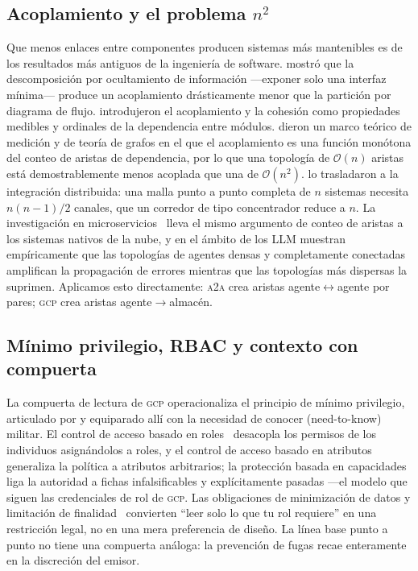 \documentclass[10pt,twocolumn,letterpaper]{article}
\newcommand{\gcp}{\textsc{gcp}}
\newcommand{\ata}{\textsc{a2a}}
\newcommand{\bigoh}{\mathcal{O}}
\begin{document}
\subsection{Acoplamiento y el problema $n^2$}
Que menos enlaces entre componentes producen sistemas más mantenibles es de los
resultados más antiguos de la ingeniería de software. \citet{parnas1972} mostró
que la descomposición por ocultamiento de información ---exponer solo una interfaz
mínima--- produce un acoplamiento drásticamente menor que la partición por
diagrama de flujo. \citet{stevens1974} introdujeron el acoplamiento y la cohesión
como propiedades medibles y ordinales de la dependencia entre módulos.
\citet{briand1999} dieron un marco teórico de medición y de teoría de grafos en
el que el acoplamiento es una función monótona del conteo de aristas de
dependencia, por lo que una topología de $\bigoh(n)$ aristas está demostrablemente
menos acoplada que una de $\bigoh(n^2)$. \citet{hohpe2003} lo trasladaron a la
integración distribuida: una malla punto a punto completa de $n$ sistemas necesita
$n(n{-}1)/2$ canales, que un corredor de tipo concentrador reduce a $n$. La
investigación en microservicios~\citep{panichella2021} lleva el mismo argumento de
conteo de aristas a los sistemas nativos de la nube, y en el ámbito de los LLM
\citet{shen2025topology} muestran empíricamente que las topologías de agentes
densas y completamente conectadas amplifican la propagación de errores mientras
que las topologías más dispersas la suprimen. Aplicamos esto directamente: \ata{}
crea aristas agente$\leftrightarrow$agente por pares; \gcp{} crea aristas
agente$\rightarrow$almacén.

\subsection{Mínimo privilegio, RBAC y contexto con compuerta}
La compuerta de lectura de \gcp{} operacionaliza el principio de mínimo
privilegio, articulado por \citet{saltzer1975} y equiparado allí con la necesidad
de conocer (need-to-know) militar. El control de acceso basado en
roles~\citep{sandhu1996} desacopla los permisos de los individuos asignándolos a
roles, y el control de acceso basado en atributos~\citep{nist800162} generaliza la
política a atributos arbitrarios; la protección basada en
capacidades~\citep{dennis1966} liga la autoridad a fichas infalsificables y
explícitamente pasadas ---el modelo que siguen las credenciales de rol de \gcp{}.
Las obligaciones de minimización de datos y limitación de
finalidad~\citep{gdpr2016} convierten ``leer solo lo que tu rol requiere'' en una
restricción legal, no en una mera preferencia de diseño. La línea base punto a
punto no tiene una compuerta análoga: la prevención de fugas recae enteramente en
la discreción del emisor.
\end{document}
